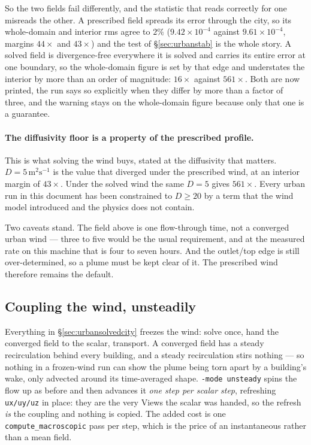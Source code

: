 \documentclass[11pt,a4paper]{article}
\begin{document}
So the two fields fail differently, and the statistic that reads correctly for
one misreads the other. A prescribed field spreads its error through the city,
so its whole-domain and interior rms agree to $2\%$ ($9.42\times10^{-4}$ against
$9.61\times10^{-4}$, margins $44\times$ and $43\times$) and the test of
\S\ref{sec:urbanstab} is the whole story. A solved field is divergence-free
everywhere it is solved and carries its entire error at one boundary, so the
whole-domain figure is set by that edge and understates the interior by more
than an order of magnitude: $16\times$ against $561\times$. Both are now
printed, the run says so explicitly when they differ by more than a factor of
three, and the warning stays on the whole-domain figure because only that one is
a guarantee.

\paragraph{The diffusivity floor is a property of the prescribed profile.} This
is what solving the wind buys, stated at the diffusivity that matters.
$D = 5\,\mathrm{m^2s^{-1}}$ is the value that diverged under the prescribed
wind, at an interior margin of $43\times$. Under the solved wind the same
$D = 5$ gives $561\times$. Every urban run in this document has been constrained
to $D \geq 20$ by a term that the wind model introduced and the physics does
not contain.

Two caveats stand. The field above is one flow-through time, not a converged
urban wind --- three to five would be the usual requirement, and at the measured
rate on this machine that is four to seven hours. And the outlet/top edge is
still over-determined, so a plume must be kept clear of it. The prescribed wind
therefore remains the default.

\subsection{Coupling the wind, unsteadily}
\label{sec:urbanunsteady}

Everything in \S\ref{sec:urbansolvedcity} freezes the wind: solve once, hand the
converged field to the scalar, transport. A converged field has a steady
recirculation behind every building, and a steady recirculation stirs nothing
--- so nothing in a frozen-wind run can show the plume being torn apart by a
building's wake, only advected around its time-averaged shape. \texttt{-mode
unsteady} spins the flow up as before and then advances it \emph{one step per
scalar step}, refreshing \texttt{ux/uy/uz} in place: they are the very Views the
scalar was handed, so the refresh \emph{is} the coupling and nothing is copied.
The added cost is one \texttt{compute\_macroscopic} pass per step, which is the
price of an instantaneous rather than a mean field.
\end{document}
